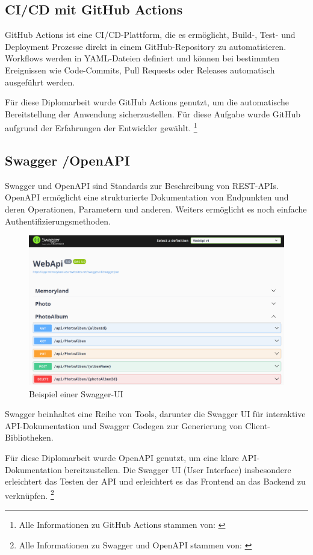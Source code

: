 \subsection{CI/CD mit GitHub Actions}

GitHub Actions ist eine CI/CD-Plattform, die es ermöglicht, Build-, Test- und 
Deployment Prozesse direkt in einem GitHub-Repository zu automatisieren. Workflows 
werden in YAML-Dateien definiert und können bei bestimmten Ereignissen wie 
Code-Commits, Pull Requests oder Releases automatisch ausgeführt werden.

Für diese Diplomarbeit wurde GitHub Actions genutzt, um die automatische Bereitstellung 
der Anwendung sicherzustellen. Für diese Aufgabe wurde GitHub aufgrund der Erfahrungen
der Entwickler gewählt.
\footnote{Alle Informationen zu GitHub Actions stammen von: \cite{GitHuba}}


\subsection{Swagger \slash OpenAPI}

Swagger und OpenAPI sind Standards zur Beschreibung von REST-APIs. OpenAPI ermöglicht 
eine strukturierte Dokumentation von Endpunkten und deren Operationen, Parametern und
anderen. Weiters ermöglicht es noch einfache Authentifizierungsmethoden.

\begin{figure} [h t]
    \centering
    \includegraphics[scale=0.15]{pics/swagger-ui-example.png}
    \caption{Beispiel einer Swagger-UI}
    \label{fig:swagger-ui-example}
\end{figure}

Swagger beinhaltet eine Reihe von Tools, darunter die Swagger UI für interaktive 
API-Dokumentation und Swagger Codegen zur Generierung von Client-Bibliotheken.

Für diese Diplomarbeit wurde OpenAPI genutzt, um eine klare API-Dokumentation bereitzustellen. 
Die Swagger UI (User Interface) insbesondere erleichtert das Testen der API und erleichtert 
es das Frontend an das Backend zu verknüpfen.
\footnote{Alle Informationen zu Swagger und OpenAPI stammen von: \cite{SmartBearSoftware}}

